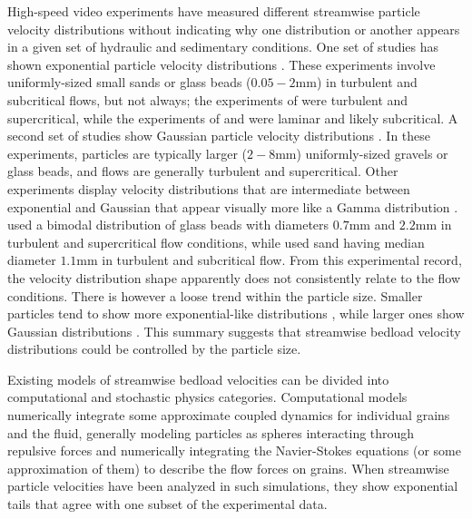 High-speed video experiments have measured different streamwise particle velocity distributions without indicating why one distribution or another appears in a given set of hydraulic and sedimentary conditions.
One set of studies has shown exponential particle velocity distributions \citep{Charru2004,Lajeunesse2010,Roseberry2012,Seizilles2014,Fathel2015,Fathel2016}.
These experiments involve uniformly-sized small sands or glass beads ($0.05-2$mm) in turbulent and subcritical flows, but not always; the experiments of \citet{Lajeunesse2010} were turbulent and supercritical, while the experiments of \citet{Charru2004} and \citet{Seizilles2014} were laminar and likely subcritical.
A second set of studies show Gaussian particle velocity distributions \citep{Ancey2014,Heyman2016,Martin2012}. In these experiments, particles are typically larger ($2-8$mm) uniformly-sized gravels or glass beads, and flows are generally turbulent and supercritical.
Other experiments display velocity distributions that are intermediate between exponential and Gaussian that appear visually more like a Gamma distribution \citep{Houssais2012, Liu2019}.
\citet{Houssais2012} used a bimodal distribution of glass beads with diameters $0.7$mm and $2.2$mm in turbulent and supercritical flow conditions, while \citet{Liu2019} used sand having median diameter $1.1$mm in turbulent and subcritical flow.
From this experimental record, the velocity distribution shape apparently does not consistently relate to the flow conditions.
There is however a loose trend within the particle size.
Smaller particles tend to show more exponential-like distributions \citep[e.g.][]{Fathel2015}, while larger ones show Gaussian distributions \citep[e.g.][]{Heyman2016}. This summary suggests that streamwise bedload velocity distributions could be controlled by the particle size.

Existing models of streamwise bedload velocities can be divided into computational and stochastic physics categories.
Computational models numerically integrate some approximate coupled dynamics for individual grains and the fluid, generally modeling particles as spheres interacting through repulsive forces and numerically integrating the Navier-Stokes equations (or some approximation of them) to describe the flow forces on grains.
When streamwise particle velocities have been analyzed in such simulations, they show exponential tails \citep{Gonzalez2017,Furbish2013} that agree with one subset of the experimental data.

